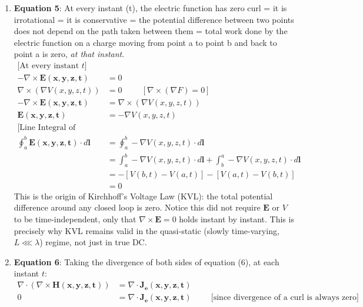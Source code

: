 \begin{enumerate}
  \item \textbf{Equation 5}: At every instant (t), the electric function  has zero
    curl = it is irrotational = it is conservative = the potential difference between
    two points does not depend on the path taken between them = total work done by
    the electric function on a charge moving from point a to point b and back to
    point a is zero, \emph{at that instant}.
    \begin{align*}
      \text{[At every instant \(t\)]} \\
      -\nabla \times \mathbf{E(x,y,z,t)} &= 0 \\
      \nabla \times (\nabla V(x,y,z,t)) &= 0 \hspace{1cm} \left[\nabla \times (\nabla F) = 0 \right] \\
      -\nabla \times \mathbf{E(x,y,z,t)} &= \nabla \times (\nabla V(x,y,z,t)) \\
      \mathbf{E(x,y,z,t)} &= -\nabla V(x,y,z,t) \\
      \text{[Line Integral of Electric Function: A to B to A]} \\
      \oint_a^b \mathbf{E(x,y,z,t)} \cdot d\mathbf{l} &= \oint_a^b -\nabla V(x,y,z,t) \cdot d\mathbf{l} \\
                                                &= \int_a^b -\nabla V(x,y,z,t) \cdot d\mathbf{l} + \int_b^a -\nabla V(x,y,z,t) \cdot d\mathbf{l} \\
                                                &= -\left[ V(b,t) - V(a,t) \right] - \left[ V(a,t) - V(b,t) \right] \\
                                                &= 0
    \end{align*}
    This is the origin of Kirchhoff's Voltage Law (KVL): the total potential difference
    around any closed loop is zero. Notice this did not require \(\mathbf{E}\) or \(V\)
    to be time-independent, only that \(\nabla\times\mathbf{E}=0\) holds instant by
    instant. This is precisely why KVL remains valid in the quasi-static (slowly
    time-varying, \(L \lll \lambda\)) regime, not just in true DC.\
  \item \textbf{Equation 6}: Taking the divergence of both sides of
    equation (6), at each instant \(t\):
    \begin{align*}
      \nabla \cdot (\nabla \times \mathbf{H(x,y,z,t)}) &= \nabla \cdot \mathbf{J_e(x,y,z,t)} \\
      0 &= \nabla \cdot \mathbf{J_e(x,y,z,t)} \hspace{1cm} \text{[since divergence of a curl is always zero]} \tag{7}
    \end{align*}


\end{enumerate}
